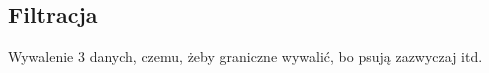 	\subsection{Filtracja}
Wywalenie 3 danych, czemu, żeby graniczne wywalić, bo psują zazwyczaj itd.	
	

